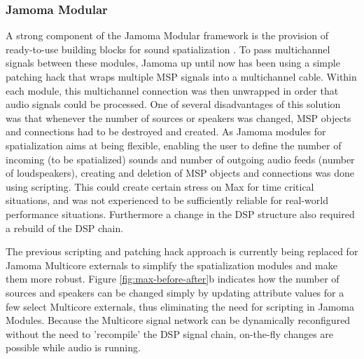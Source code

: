\documentclass[twoside,a4paper]{article}
\begin{document}
\subsubsection{Jamoma Modular} %
A strong component of the Jamoma Modular framework is the provision of ready-to-use building blocks for sound spatialization \cite{Peters:2009}.
To pass multichannel signals between these modules, Jamoma up until now has been using a simple patching hack that wraps multiple MSP signals into a multichannel cable. Within each module, this multichannel connection was then unwrapped in order that audio signals could be processed. 
One of several disadvantages of this solution was that whenever the number of sources or speakers was changed, MSP objects and connections had to be destroyed and created.
As Jamoma modules for spatialization aims at being flexible, enabling the user to define the number of incoming (to be spatialized) sounds and number of outgoing audio feeds (number of loudspeakers), creating and deletion of MSP objects and connections was done using scripting.
This could create certain stress on Max for time critical situations, and was not experienced to be sufficiently reliable for real-world performance situations.
Furthermore a change in the DSP structure also required a rebuild of the DSP chain.

The previous scripting and patching hack approach is currently being replaced for Jamoma Multicore externals to simplify the spatialization modules and make them more robust.
Figure \ref{fig:max-before-after}b indicates how the number of sources and speakers can be changed simply by updating attribute values for a few select Multicore externals, thus eliminating the need for scripting in Jamoma Modules.
Because the Multicore signal network can be dynamically reconfigured without the need to 'recompile' the DSP signal chain, on-the-fly changes are possible while audio is running.


\end{document}
